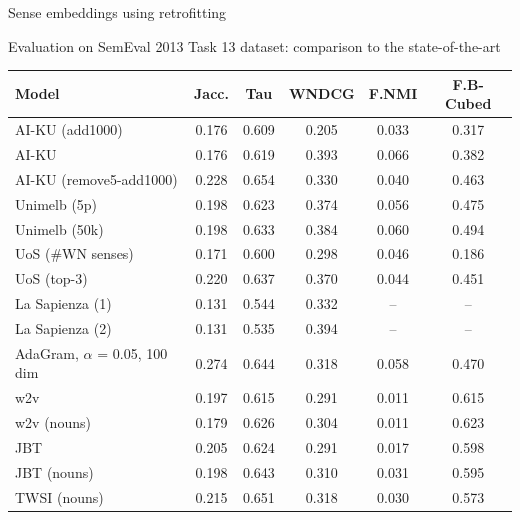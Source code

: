 \documentclass[usenames,dvipsnames]{beamer}
\begin{document}
\begin{frame}{Sense embeddings using retrofitting}

Evaluation on SemEval 2013 Task 13 dataset: comparison to the state-of-the-art

	\vspace{-0.4cm}
	\footnotesize
	\begin{center}
		\begin{tabular}{l|ccc|cc}
			\bf Model & \bf Jacc. & \bf Tau & \bf WNDCG & \bf F.NMI & \bf F.B-Cubed \\ 
			\midrule
			
			AI-KU (add1000) & 0.176 & 0.609 & 0.205 & 0.033 & 0.317 \\
			AI-KU & 0.176 & 0.619 & 0.393 & 0.066 & 0.382 \\
			AI-KU (remove5-add1000) & 0.228 & 0.654 & 0.330 & 0.040 & 0.463 \\
			Unimelb (5p) & 0.198 & 0.623 & 0.374 & 0.056 & 0.475 \\
			Unimelb (50k) & 0.198 & 0.633 & 0.384 & 0.060 & 0.494 \\
			UoS (\#WN senses) & 0.171 & 0.600 & 0.298 & 0.046 & 0.186 \\
			UoS (top-3) & 0.220 & 0.637 & 0.370 & 0.044 & 0.451 \\
			La Sapienza (1) & 0.131 & 0.544 & 0.332 & --  & -- \\
			La Sapienza (2) & 0.131 & 0.535 & 0.394 & -- & -- \\ \midrule
			AdaGram, $\alpha$ = 0.05, 100 dim & 0.274 & 0.644  & 0.318  & 0.058  & 0.470  \\ \midrule
			\alert{w2v}  & 0.197 & 0.615 & 0.291 & 0.011 & 0.615 \\
			\alert{w2v (nouns)} & 0.179 & 0.626 & 0.304 & 0.011 & 0.623 \\
			
			\alert{JBT} & 0.205 & 0.624 & 0.291 & 0.017 & 0.598\\
			\alert{JBT (nouns)} & 0.198 & 0.643 & 0.310 & 0.031 & 0.595\\
			\alert{TWSI (nouns)} & 0.215 & 0.651 & 0.318 & 0.030 & 0.573 \\ 
				
		\end{tabular}
	\end{center}
\end{frame}
\end{document}
